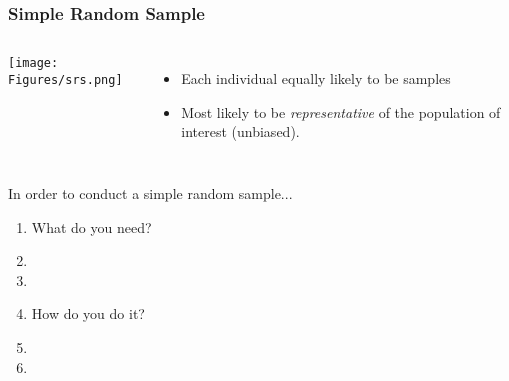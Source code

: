 \begin{frame}
\frametitle{Simple Random Sample}
\begin{columns}
\texttt{[image: Figures/srs.png]}
\begin{itemize}
\item
Each individual equally likely to be samples
\item
Most likely to be \emph{representative} of the population of interest (unbiased).
\end{itemize}
\end{columns}
\begin{clicker}{In order to conduct a simple random sample...}
\begin{enumerate}
\item What do you need?
\item[]
\item[]
\item How do you do it?
\item[]
\item[]
\end{enumerate}
\end{clicker}
\end{frame}
%
%
%
%
